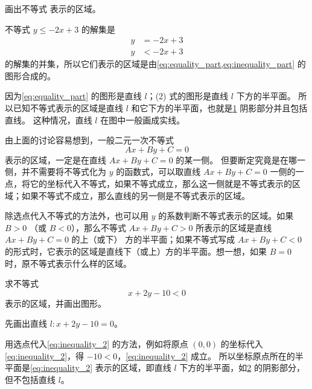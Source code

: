 \begin{example}
  画出不等式  表示的区域。
\end{example}
\begin{solution}
  不等式 $y\leqslant-2x+3$ 的解集是
  \begin{align}
    \label{eq:equality_part}   y & = -2x+3\\
    \label{eq:inequality_part} y & < -2x+3
  \end{align}
  的解集的并集，所以它们表示的区域是由\cref{eq:equality_part,eq:inequality_part} 的图形合成的。

  因为\cref{eq:equality_part} 的图形是直线 $l$；(2) 式的图形是直线 $l$ 下方的半平面。
  所以已知不等式表示的区域是直线 $l$ 和它下方的半平面，也就是\cref{fig:1-25} 阴影部分并且包括直线。
  这种情况，直线 $l$ 在图中一般画成实线。

由上面的讨论容易想到，一般二元一次不等式
\[ Ax+By+C=0\]
表示的区域，一定是在直线 $Ax+By+C=0$ 的某一侧。
但要断定究竟是在哪一侧，并不需要将不等式化为 $y$ 的函数式，可以取直线 $Ax+By+C=0$ 一侧的一点，将它的坐标代入不等式，如果不等式成立，那么这一侧就是不等式表示的区域；如果不等式不成立，那么直线的另一侧是不等式表示的区域。

除选点代入不等式的方法外，也可以用 $y$ 的系数判断不等式表示的区域。如果 $B>0$ （或 $B<0$），那么不等式 $Ax+By+C>0$ 所表示的区域是直线 $Ax+By+C=0$ 的上（或下） 方的半平面；如果不等式写成  $Ax+By+C<0$ 的形式时，它表示的区域是直线下（或上）方的半平面。想一想，如果 $B=0$ 时，原不等式表示什么样的区域。
\end{solution}
\begin{figure}
  \caption{}\label{fig:1-25}
\end{figure}
\begin{example}\label{exp:1-13}
  求不等式
  \begin{equation} 
    \label{eq:inequality_2}
    x+2y-10<0
  \end{equation}
  表示的区域，并画出图形。
\end{example}

\begin{solution}
  先画出直线 $l:x+2y-10=0$。

  用选点代入\cref{eq:inequality_2} 的方法，例如将原点 $(0,0)$ 的坐标代入\cref{eq:inequality_2}，得 $-10<0$，\cref{eq:inequality_2} 成立。
  所以坐标原点所在的半平面是\cref{eq:inequality_2} 表示的区域，即直线 $l$ 下方的半平面，如\cref{fig:1-26} 的阴影部分，但不包括直线 $l$。
\end{solution}
\begin{figure}
  \caption{}\label{fig:1-26}
\end{figure}

